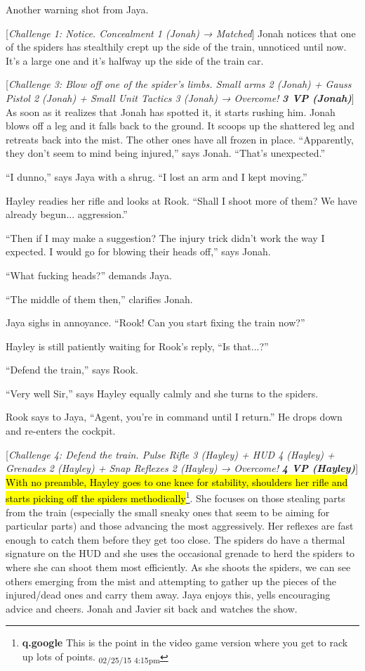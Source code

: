 Another warning shot from Jaya.

{[}\textit{Challenge 1: Notice.  Concealment 1 (Jonah) → Matched}{]}  Jonah notices that one of the spiders has stealthily crept up the side of the train, unnoticed until now.  It's a large one and it's halfway up the side of the train car.  

{[}\textit{Challenge 3: Blow off one of the spider's limbs.  Small arms 2 (Jonah) + Gauss Pistol 2 (Jonah) + Small Unit Tactics 3 (Jonah) → Overcome! }\textit{\textbf{3 VP (Jonah)}}{]}   As soon as it realizes that Jonah has spotted it, it starts rushing him. Jonah blows off a leg and it falls back to the ground.  It scoops up the shattered leg and retreats back into the mist. The other ones have all frozen in place.  ``Apparently, they don't seem to mind being injured,'' says Jonah. ``That's unexpected.''

``I dunno,'' says Jaya with a shrug.  ``I lost an arm and I kept moving.''



Hayley readies her rifle and looks at Rook. ``Shall I shoot more of them?  We have already begun... aggression.''

``Then if I may make a suggestion?  The injury trick didn't work the way I expected. I would go for blowing their heads off,'' says Jonah.

``What fucking heads?'' demands Jaya.

``The middle of them then,'' clarifies Jonah.

Jaya sighs in annoyance.  ``Rook!  Can you start fixing the train now?''

Hayley is still patiently waiting for Rook's reply, ``Is that...?''

``Defend the train,'' says Rook.

``Very well Sir,'' says Hayley equally calmly and she turns to the spiders.

Rook says to Jaya, ``Agent, you're in command until I return.''  He drops down and re-enters the cockpit.



{[}\textit{Challenge 4: Defend the train.  Pulse Rifle 3 (Hayley) + HUD 4 (Hayley) + Grenades 2 (Hayley) + Snap Reflexes 2 (Hayley) → Overcome! }\textit{\textbf{4 VP (Hayley)}}{]}  \hl{With no preamble, Hayley goes to one knee for stability, shoulders her rifle and starts picking off the spiders methodically}\footnote{\textbf{q.google }This is the point in the video game version where you get to rack up lots of points. \textsubscript{02/25/15 4:15pm}}.  She focuses on those stealing parts from the train (especially the small sneaky ones that seem to be aiming for particular parts) and those advancing the most aggressively.  Her reflexes are fast enough to catch them before they get too close.  The spiders do have a thermal signature on the HUD and she uses the occasional grenade to herd the spiders to where she can shoot them most efficiently.  As she shoots the spiders, we can see others emerging from the mist and attempting to gather up the pieces of the injured/dead ones and carry them away.  Jaya enjoys this, yells encouraging advice and cheers.  Jonah and Javier sit back and watches the show.




